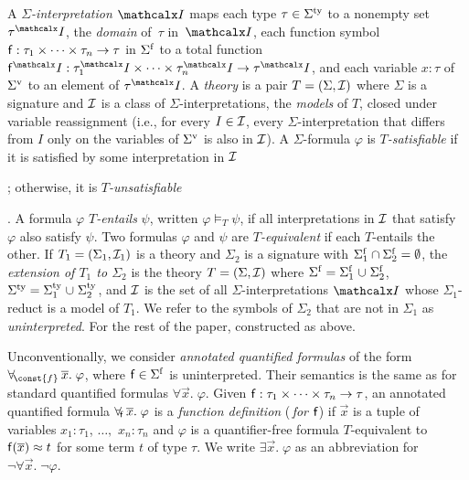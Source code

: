 A \emph{$\Sigma$-interpretation $\I$} %
maps each type $\tau \in \stypes{\Sigma}$ to a nonempty set $\tau^\I$,
the \emph{domain} of~$\tau$ in~$\I$,
each function symbol $\mathsf{f} : \tau_1 \times \cdots \times \tau_n \rightarrow \tau$ in $\sfuns{\Sigma}$
to a total function $\con{f}^\I : \tau_1^\I \times \cdots \times \tau_n^\I \rightarrow \tau^\I$,
and each variable $x:\tau$ of $\svars{\Sigma}$ to an element of $\tau^\I$.
A \emph{theory} is a pair $T = (\Sigma, \Mo)$ where
$\Sigma$ is a signature and ${\mathcal{I}}$ is a class of $\Sigma$-interpretations,
the \emph{models} of $T$, closed under variable reassignment
(i.e., for every $I \in {\mathcal{I}}$, every $\Sigma$-interpretation that differs
from $I$ only on the variables of $\svars \Sigma$ is also in ${\mathcal{I}}$).
A $\Sigma$-formula $\varphi$ is \emph{$T$-satisfiable}
if it is satisfied by some interpretation in ${\mathcal{I}}$\begin{longv};
otherwise, it is \emph{$T$-unsatisfiable}\end{longv}.
A formula $\varphi$ \emph{$T$-entails} $\psi$, written $\varphi \models_T \psi$,
if all interpretations in ${\mathcal{I}}$ that satisfy $\varphi$ also satisfy $\psi$.
Two formulas $\varphi$ and $\psi$ are \emph{$T$-equivalent} 
if each $T$-entails the other.
If $T_1 = (\Sigma_1, \Mo_1)$ is a theory and $\Sigma_2$ is a signature 
with $\sfuns{\Sigma_1} \cap \sfuns{\Sigma_2} = \emptyset$,
the \emph{extension of $T_1$ to $\Sigma_2$} is the theory $T = (\Sigma, \Mo)$ where 
$\sfuns{\Sigma} = \sfuns{\Sigma_1} \cup \sfuns{\Sigma_2}$,
$\stypes{\Sigma} = \stypes{\Sigma_1} \cup \stypes{\Sigma_2}$,
and ${\mathcal{I}}$ is the set of all $\Sigma$-interpretations $\I$
whose $\Sigma_1$-reduct is a model of $T_1$.
We refer to the symbols of $\Sigma_2$ that are not in $\Sigma_1$ as \emph{uninterpreted}.
For the rest of the paper,  constructed as above.

Unconventionally,
we consider \emph{annotated quantified formulas} of the form
$\forallf{\const{f}} \vec x.\; \varphi$, where $\con{f} \in \sfuns{\Sigma}$ is
uninterpreted. Their
semantics is the same as for standard quantified formulas $\forall \vec x.\; \varphi$.
Given $\mathsf{f} : \tau_1 \times \cdots \times \tau_n \rightarrow \tau$,
an annotated
quantified formula $\forall_{\!\mathsf{f}\:} \overline{x}.\; \varphi$ is a \emph{function definition}
(\,\emph{for $\mathsf{f}$}\vthinspace) if $\vec x$ is a tuple of variables
$x_1 : \tau_1$, $\ldots,$ $x_n : \tau_n$
and $\varphi$ is a quantifier-free formula 
$T$-equivalent to $\mathsf{f}( \overline{x} ) \approx t$ for some term $t$ of type $\tau$.
We write $\exists
\vec x.\; \varphi$ as an abbreviation for $\neg \forall \vec x.\; \neg \varphi$.

